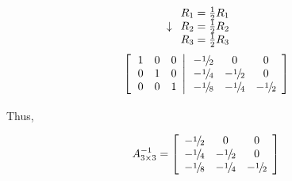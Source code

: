 \documentclass[10pt, twocolumn]{article}
\begin{document}
\[\begin{array}{*{20}{c}}
  {\begin{array}{*{20}{c}}
  { \downarrow \begin{array}{*{20}{c}}
  {{R_1} = \tfrac{1}{2}{R_1}} \\ 
  {{R_2} = \tfrac{1}{2}{R_2}} \\ 
  {{R_3} = \tfrac{1}{2}{R_3}} 
\end{array}}&{} 
\end{array}} \\[0.65cm] 
  {\left[ {\left. {\begin{array}{*{20}{c}}
  1&0&0 \\ 
  0&1&0 \\ 
  0&0&1 
\end{array}} \right|\begin{array}{*{20}{c}}
    { - {\raise0.5ex\hbox{$\scriptstyle 1$}
\kern-0.1em/\kern-0.15em
\lower0.25ex\hbox{$\scriptstyle 2$}}}&0&0 \\ 
  { - {\raise0.5ex\hbox{$\scriptstyle 1$}
\kern-0.1em/\kern-0.15em
\lower0.25ex\hbox{$\scriptstyle 4$}}}&{ - {\raise0.5ex\hbox{$\scriptstyle 1$}
\kern-0.1em/\kern-0.15em
\lower0.25ex\hbox{$\scriptstyle 2$}}}&0 \\ 
  { - {\raise0.5ex\hbox{$\scriptstyle 1$}
\kern-0.1em/\kern-0.15em
\lower0.25ex\hbox{$\scriptstyle 8$}}}&{ - {\raise0.5ex\hbox{$\scriptstyle 1$}
\kern-0.1em/\kern-0.15em
\lower0.25ex\hbox{$\scriptstyle 4$}}}&{ - {\raise0.5ex\hbox{$\scriptstyle 1$}
\kern-0.1em/\kern-0.15em
\lower0.25ex\hbox{$\scriptstyle 2$}}} 
\end{array}} \right]}\\[0.5cm] 
\end{array}\]

Thus,

\[A{{}_{3 \times 3}^{ - 1}} = \left[\begin{array}{*{20}{c}}
    { - {\raise0.5ex\hbox{$\scriptstyle 1$}
\kern-0.1em/\kern-0.15em
\lower0.25ex\hbox{$\scriptstyle 2$}}}&0&0 \\ 
  { - {\raise0.5ex\hbox{$\scriptstyle 1$}
\kern-0.1em/\kern-0.15em
\lower0.25ex\hbox{$\scriptstyle 4$}}}&{ - {\raise0.5ex\hbox{$\scriptstyle 1$}
\kern-0.1em/\kern-0.15em
\lower0.25ex\hbox{$\scriptstyle 2$}}}&0 \\ 
  { - {\raise0.5ex\hbox{$\scriptstyle 1$}
\kern-0.1em/\kern-0.15em
\lower0.25ex\hbox{$\scriptstyle 8$}}}&{ - {\raise0.5ex\hbox{$\scriptstyle 1$}
\kern-0.1em/\kern-0.15em
\lower0.25ex\hbox{$\scriptstyle 4$}}}&{ - {\raise0.5ex\hbox{$\scriptstyle 1$}
\kern-0.1em/\kern-0.15em
\lower0.25ex\hbox{$\scriptstyle 2$}}} 
\end{array} \right]\]
\end{document}
